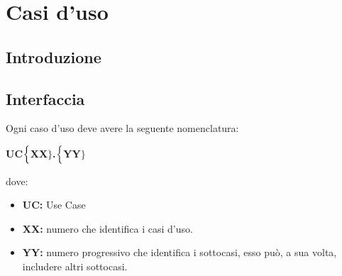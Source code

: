 \chapter{Casi d'uso}

\section{Introduzione}

\section{Interfaccia}
Ogni caso d'uso deve avere la seguente nomenclatura:

\begin{center}
	\textbf{UC$\Bigl\{$XX$\Bigr\}$.$\Bigl\{$YY$\Bigr\}$}
\end{center}
dove:
\begin{itemize}
	\item \textbf{UC:} Use Case
	\item \textbf{{XX}:} numero che identifica i casi d'uso.
	\item \textbf{{YY}:} numero progressivo che identifica i sottocasi, esso può, a sua volta, includere altri sottocasi.
\end{itemize}


\noindent{}


